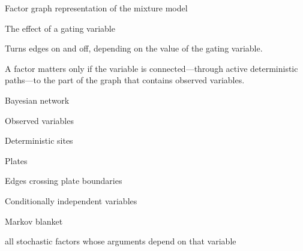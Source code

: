 \documentclass[10pt,aspectratio=169]{beamer}
\begin{document}
\begin{frame}{Factor graph representation of the mixture model}
\begin{center}
    \end{center}

\end{frame}

\begin{frame}{The effect of a gating variable}

    Turns edges on and off, depending on the value of the gating variable.

    A factor matters only if the variable is connected—through active deterministic paths—to the part of the graph that contains observed variables.

\end{frame}

\begin{frame}{Bayesian network}
\end{frame}

\begin{frame}{Observed variables}
\end{frame}

\begin{frame}{Deterministic sites}
\end{frame}

\begin{frame}{Plates}
\end{frame}

\begin{frame}{Edges crossing plate boundaries}
\end{frame}

\begin{frame}{Conditionally independent variables}
\end{frame}

\begin{frame}{Markov blanket}

    all stochastic factors whose arguments depend on that variable

\end{frame}
\end{document}
